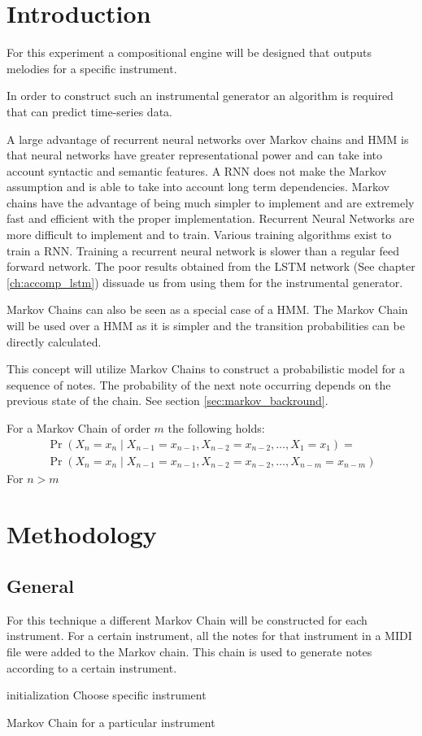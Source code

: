 \section{Introduction}
For this experiment a compositional engine will be designed that outputs melodies for a specific instrument. 

In order to construct such an instrumental generator an algorithm is required that can predict time-series data.

A large advantage of recurrent neural networks over Markov chains and \acs{HMM} is that neural networks have greater representational power and can take into account syntactic and semantic features. A \ac{RNN} does not make the Markov assumption and is able to take into account long term dependencies.
Markov chains have the advantage of being much simpler to implement and are extremely fast and efficient with the proper implementation. 
Recurrent Neural Networks are more difficult to implement and to train. Various training algorithms exist to train a \ac{RNN}. Training a recurrent neural network is slower than a regular feed forward network. The poor results obtained from the \ac{LSTM} network (See chapter \ref{ch:accomp_lstm}) dissuade us from using them for the instrumental generator.

Markov Chains can also be seen as a special case of a \ac{HMM}. The Markov Chain will be used over a \ac{HMM} as it is simpler and the transition probabilities can be directly calculated.

This concept will utilize Markov Chains to construct a probabilistic model for a sequence of notes. The probability of the next note occurring depends on the previous state of the chain. See section \ref{sec:markov_backround}.

For a Markov Chain of order $m$ the following holds:
\begin{align}
\Pr(X_n=x_n\mid X_{n-1}=x_{n-1}, X_{n-2}=x_{n-2}, \dots , X_1=x_1) =
\\  \Pr(X_n=x_n\mid X_{n-1}=x_{n-1}, X_{n-2}=x_{n-2}, \dots, X_{n-m}=x_{n-m})
\end{align}
For $n > m$

\section{Methodology}
\subsection{General}
For this technique a different Markov Chain will be constructed for each instrument. 
For a certain instrument, all the notes for that instrument in a MIDI file were added to the Markov chain. This chain is used to generate notes according to a certain instrument.
\begin{algorithm}
 initialization\;
 Choose specific instrument\;
 \caption{Markov Chain for a particular instrument}
 \label{algo:instrumm}
\end{algorithm}

